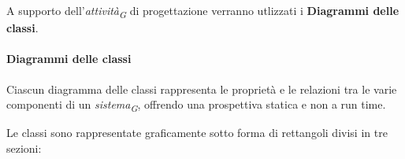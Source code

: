 A supporto dell'\textit{attività}\textsubscript{\textit{G}} di progettazione verranno utlizzati i \textbf{Diagrammi delle classi}. \\

\paragraph*{Diagrammi delle classi}
Ciascun diagramma delle classi rappresenta le proprietà e le relazioni tra le varie componenti di un \textit{sistema}\textsubscript{\textit{G}}, offrendo una prospettiva statica e non a run time.

\vspace{0.2cm}

Le classi sono rappresentate graficamente sotto forma di rettangoli divisi in tre sezioni:


